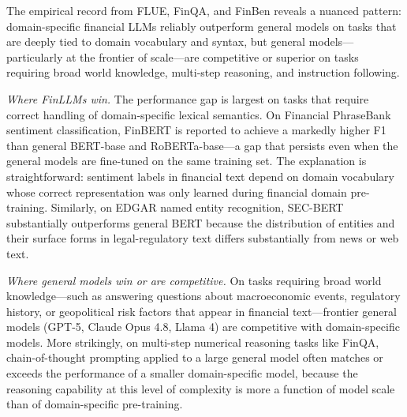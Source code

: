 The empirical record from FLUE, FinQA, and FinBen reveals a nuanced pattern:
domain-specific financial LLMs reliably outperform general models on tasks that
are deeply tied to domain vocabulary and syntax, but general models---particularly
at the frontier of scale---are competitive or superior on tasks requiring
broad world knowledge, multi-step reasoning, and instruction following.

\textit{Where FinLLMs win.}  The performance gap is largest on tasks that require
correct handling of domain-specific lexical semantics.  On Financial PhraseBank
sentiment classification, FinBERT \cite{araci2019finbert} is reported to achieve a
markedly higher F1 than general BERT-base and RoBERTa-base---a gap that persists even when the general models are fine-tuned
on the same training set.  The explanation is straightforward: sentiment labels
in financial text depend on domain vocabulary whose correct representation was
only learned during financial domain pre-training.  Similarly, on EDGAR named
entity recognition, SEC-BERT \cite{loukas2022secbert} substantially outperforms
general BERT because the distribution of entities and their surface forms in
legal-regulatory text differs substantially from news or web text.

\textit{Where general models win or are competitive.}  On tasks requiring broad
world knowledge---such as answering questions about macroeconomic events, regulatory
history, or geopolitical risk factors that appear in financial text---frontier
general models (GPT-5, Claude Opus 4.8, Llama 4) are competitive with domain-specific
models.  More strikingly, on multi-step numerical reasoning tasks like FinQA,
chain-of-thought prompting \cite{wei2022chain} applied to a large general model
often matches or exceeds the performance of a smaller domain-specific model,
because the reasoning capability at this level of complexity is more a function
of model scale than of domain-specific pre-training.

